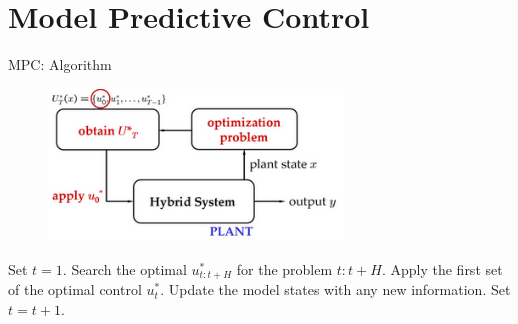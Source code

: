 \documentclass[handout]{beamer}
\begin{document}
\section{Model Predictive Control}
\begin{frame}{MPC: Algorithm}
  \begin{figure}
    \centering
    \includegraphics[width = 0.7\textwidth]{figures/mpc.png}
  \end{figure}

  \begin{algorithmic}[1]
  \State Set $t = 1$.
  \State Search the optimal $u^*_{t:t+H}$ for the problem $t:t+H$.
  \State Apply the first set of the optimal control  $u^*_{t}$.
  \State Update the model states with any new information.
  \State Set $t = t + 1$.
  \EndWhile
  \end{algorithmic}
\end{frame}
\end{document}
